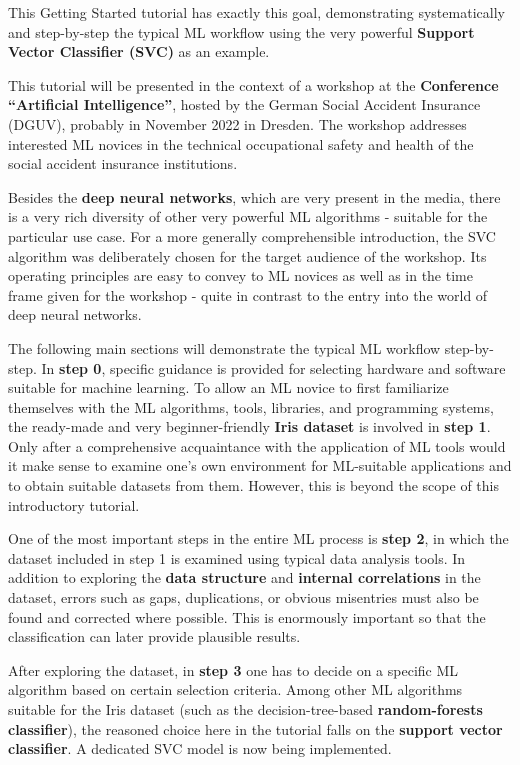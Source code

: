 \documentclass [oneside,10pt,a4paper,ngerman,BCOR10mm,headsepline,parindent,final]{scrartcl}
\begin{document}
This Getting Started tutorial has exactly this goal, demonstrating
systematically and step-by-step the typical ML workflow using the very
powerful \textbf{Support Vector Classifier (SVC)} as an example.

This tutorial will be presented in the context of a workshop at the
\textbf{Conference ``Artificial Intelligence''}, hosted by the German
Social Accident Insurance (DGUV), probably in November 2022 in Dresden.
The workshop addresses interested ML novices in the technical
occupational safety and health of the social accident insurance
institutions.

Besides the \textbf{deep neural networks}, which are very present in the
media, there is a very rich diversity of other very powerful ML
algorithms - suitable for the particular use case. For a more generally
comprehensible introduction, the SVC algorithm was deliberately chosen
for the target audience of the workshop. Its operating principles are
easy to convey to ML novices as well as in the time frame given for the
workshop - quite in contrast to the entry into the world of deep neural
networks.

The following main sections will demonstrate the typical ML workflow
step-by-step. In \textbf{step 0}, specific guidance is provided for
selecting hardware and software suitable for machine learning. To allow
an ML novice to first familiarize themselves with the ML algorithms,
tools, libraries, and programming systems, the ready-made and very
beginner-friendly \textbf{Iris dataset} is involved in \textbf{step 1}.
Only after a comprehensive acquaintance with the application of ML tools
would it make sense to examine one's own environment for ML-suitable
applications and to obtain suitable datasets from them. However, this is
beyond the scope of this introductory tutorial.

One of the most important steps in the entire ML process is \textbf{step
2}, in which the dataset included in step 1 is examined using typical
data analysis tools. In addition to exploring the \textbf{data
structure} and \textbf{internal correlations} in the dataset, errors
such as gaps, duplications, or obvious misentries must also be found and
corrected where possible. This is enormously important so that the
classification can later provide plausible results.

After exploring the dataset, in \textbf{step 3} one has to decide on a
specific ML algorithm based on certain selection criteria. Among other
ML algorithms suitable for the Iris dataset (such as the
decision-tree-based \textbf{random-forests classifier}), the reasoned
choice here in the tutorial falls on the \textbf{support vector
classifier}. A dedicated SVC model is now being implemented.
\end{document}
